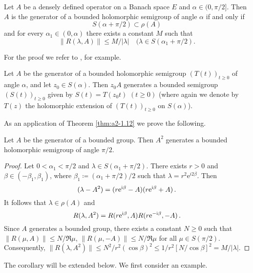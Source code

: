 \begin{theorem}\label{thm:a2-1.12}
Let $A$ be a densely defined operator on a Banach space $E$ and $\alpha \in (0,\pi/2]$.
Then $A$ is the generator of a bounded holomorphic semigroup of angle $\alpha$ if and only if 
\[
S(\alpha + \pi/2) \subset \rho(A)
\]
and for every $\alpha_{1} \in (0,\alpha)$ there exists a constant $M$ such that
\begin{equation}\label{eq:a2-1.6}
    \|R(\lambda,A)\| \leq M/|\lambda| \quad (\lambda \in S(\alpha_{1} + \pi/2). 
\end{equation}
\end{theorem}
For the proof we refer to \citet{davies:1980}, for example.

\begin{remark*}\label{rem:a2-1.6-kgk}
Let $A$ be the generator of a bounded holomorphic semigroup $(T(t))_{t \geq 0}$ 
of angle $\alpha$, and let $z_{0} \in S(\alpha)$.
Then $z_{0}A$ generates a bounded semigroup 
$(S(t))_{t \geq 0}$ given by $S(t) = T(z_{0}t)$  $(t \geq 0)$ (where again we denote by $T(z)$ the holomorphic extension of $(T(t))_{t \geq 0}$ on $S(\alpha)$).
\end{remark*}
As an application of Theorem \ref{thm:a2-1.12}  we prove the following.
\begin{corollary}\label{cor:a2-1.13}
Let $A$ be the generator of a bounded group.
Then $A^{2}$ generates a bounded holomorphic semigroup of angle $\pi/2$.
\end{corollary}
\begin{proof}
Let $0 < \alpha_{1} < \pi/2$ and $\lambda \in S(\alpha_{1} + \pi/2)$.
There exists $r > 0$ and $\beta \in (-\beta_{1},\beta_{1})$,
where $\beta_{1} \coloneqq (\alpha_{1} + \pi/2)/2$
such that $\lambda = r^{2}\mathrm{e}^{i2\beta}$.
Then 
\[
(\lambda - A^{2}) = (r\mathrm{e}^{\mathrm{i}\beta} - A)(r\mathrm{e}^{\mathrm{i}\beta} + A) \, .
\] 
It follows that $\lambda \in \rho(A)$ and 
\begin{equation}\label{eq:a2-1.7}
    R(\lambda,A^{2}) = R(r\mathrm{e}^{\mathrm{i}\beta},A)R(r\mathrm{e}^{-\mathrm{i}\beta},-A) \, .
\end{equation}
Since $A$ generates a bounded group, there exists a constant $N \geq 0$ such that \\ 
$\|R(\mu,A)\| \leq N/\Re\mu$, $\|R(\mu,-A)\| \leq N/\Re\mu$ for all $\mu \in S(\pi/2)$.
Consequently, $\|R(\lambda,A^{2})\| \leq N^{2}/r^{2}(\cos\beta)^{2} \leq 1/r^{2}[N/\cos\beta]^{2} = M/|\lambda|$.
\end{proof}
The corollary will be extended below.
We first consider an example.

